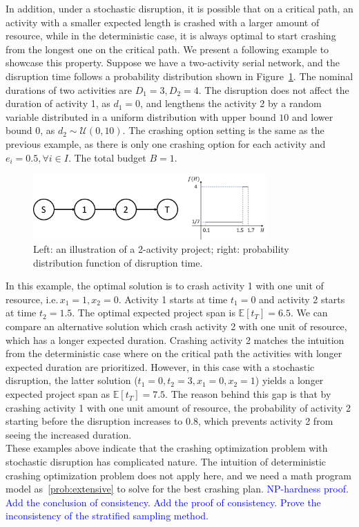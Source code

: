 \documentclass[11pt]{article}
\newcommand{\noi}{\noindent}
\begin{document}
	In addition, under a stochastic disruption, it is possible that on a critical path, an activity with a smaller expected length is crashed with a larger amount of resource, while in the deterministic case, it is always optimal to start crashing from the longest one on the critical path. We present a following example to showcase this property. Suppose we have a two-activity serial network, and the disruption time follows a probability distribution shown in Figure~\ref{fig:2act}. The nominal durations of two activities are \(D_1 = 3, D_2 = 4\). The disruption does not affect the duration of activity 1, as \(d_1 = 0\), and lengthens the activity 2 by a random variable distributed in a uniform distribution with upper bound \(10\) and lower bound \(0\), as \(d_2 \sim \mathcal{U}(0,10)\). The crashing option setting is the same as the previous example, as there is only one crashing option for each activity and \(e_i = 0.5, \forall i \in I\). The total budget \(B = 1\).
		\begin{figure}[H]
			\centering
			\includegraphics[width=0.8\textwidth]{2act}
			\caption{Left: an illustration of a 2-activity project; right: probability distribution function of disruption time.}
			\label{fig:2act}
		\end{figure}
	\noi In this example, the optimal solution is to crash activity 1 with one unit of resource, i.e.\,\(x_1 = 1, x_2 = 0\). Activity 1 starts at time \(t_1 = 0\) and activity 2 starts at time \(t_2 = 1.5\). The optimal expected project span is \(\mathbb{E}[t_T] = 6.5\). We can compare an alternative solution which crash activity 2 with one unit of resource, which has a longer expected duration. Crashing activity 2 matches the intuition from the deterministic case where on the critical path the activities with longer expected duration are prioritized. However, in this case with a stochastic disruption, the latter solution (\(t_1 = 0, t_2 = 3, x_1 = 0, x_2 = 1\)) yields a longer expected project span as \(\mathbb{E}[t_T] = 7.5\). The reason behind this gap is that by crashing activity 1 with one unit amount of resource, the probability of activity 2 starting before the disruption increases to \(0.8\), which prevents activity 2 from seeing the increased duration. \\
	\newline
	These examples above indicate that the crashing optimization problem with stochastic disruption has complicated nature. The intuition of deterministic crashing optimization problem does not apply here, and we need a math program model as~\eqref{prob:extensive} to solve for the best crashing plan.
	\textcolor{blue}{NP-hardness proof. Add the conclusion of consistency. Add the proof of consistency. Prove the inconsistency of the stratified sampling method. }
	
\end{document}
